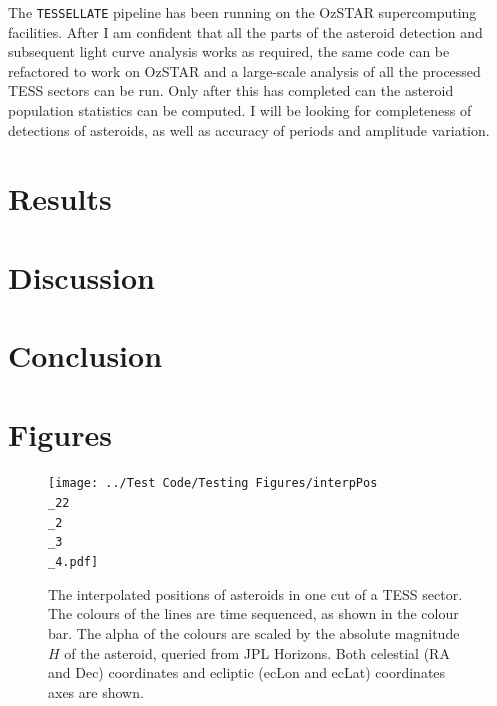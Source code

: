 \documentclass[12pt]{article}
\begin{document}
The \texttt{TESSELLATE} pipeline has been running on the OzSTAR supercomputing facilities. 
After I am confident that all the parts of the asteroid detection and subsequent light curve analysis works as required, the same code can be refactored to work on OzSTAR and a large-scale analysis of all the processed TESS sectors can be run. 
Only after this has completed can the asteroid population statistics can be computed. 
I will be looking for completeness of detections of asteroids, as well as accuracy of periods and amplitude variation.

\section{Results}\label{Sec:Res}
\section{Discussion}\label{Sec:Disc}
\section{Conclusion}\label{Sec:Conc}

\section{Figures}

\begin{figure}
  \centering
    \texttt{[image: ../Test Code/Testing Figures/interpPos\\\_22\\\_2\\\_3\\\_4.pdf]}
    \caption[Interpolated positions of asteroids]{The interpolated positions of asteroids in one cut of a TESS sector. 
    The colours of the lines are time sequenced, as shown in the colour bar.
    The alpha of the colours are scaled by the absolute magnitude $H$ of the asteroid, queried from JPL Horizons. 
    Both celestial (RA and Dec) coordinates and ecliptic (ecLon and ecLat) coordinates axes are shown.
    }
    \label{Fig:interpPos}
\end{figure}
\end{document}
